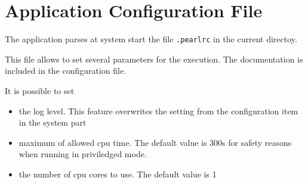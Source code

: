 \section{Application Configuration File}

The application parses at system start the file \texttt{.pearlrc} in
the current directoy.

This file allows to set several parameters for the execution.
The documentation is included in the configuration file.

It is possible to set
\begin{itemize}
\item the log level. This feature overwrites the setting 
   from the configuration item in the system part
\item maximum of allowed cpu time. The default value is 300s for safety reasons 
   when running in priviledged mode.
\item the number of cpu cores to use. The default value is 1
\end{itemize}


